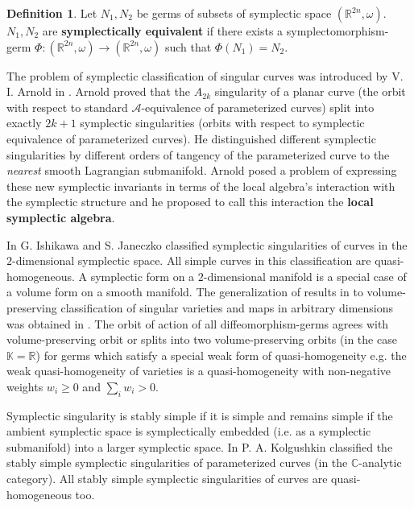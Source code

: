 \documentclass{amsart}
\theoremstyle{definition}
\newtheorem{defn}[thm]{Definition}
\numberwithin{equation}{section}
\begin{document}
\begin{defn} \label{symplecto}
Let $N_1, N_2$ be germs of subsets of symplectic space $(\mathbb{R}^{2n}, \omega)$. $N_1, N_2$
are \textbf{symplectically equivalent} if there exists a symplectomorphism-germ $\Phi:(\mathbb{R}^{2n}, \omega) \rightarrow(\mathbb{R}^{2n}, \omega)$
such that $\Phi(N_1)=N_2$.
\end{defn}

\medskip

The problem of symplectic classification of singular curves was
introduced by V. I. Arnold in \cite{Ar1}. Arnold proved that the
$A_{2k}$ singularity of a planar curve (the orbit with respect to
standard $\mathcal A$-equivalence of parameterized curves) split
into exactly $2k+1$ symplectic singularities (orbits with respect
to symplectic equivalence of parameterized curves). He
distinguished different symplectic singularities by different
orders of tangency of the parameterized curve to the
\emph{nearest} smooth Lagrangian submanifold. Arnold posed a
problem of expressing these new symplectic invariants in terms of
the local algebra's interaction with the symplectic structure and
he proposed to call this interaction the {\bf local symplectic
algebra}.

In \cite{IJ1} G. Ishikawa and S. Janeczko classified symplectic singularities of curves in the
$2$-dimensional symplectic space. All simple curves in this classification are quasi-homogeneous. A symplectic form on a $2$-dimensional manifold
is a special case of a volume form on a smooth manifold. The generalization of results
in \cite{IJ1} to volume-preserving classification of singular varieties and maps  in arbitrary dimensions was obtained in \cite{DR}.
The orbit of action of all diffeomorphism-germs agrees with volume-preserving orbit or splits into two volume-preserving orbits
(in the case $\mathbb K=\mathbb R$) for germs which satisfy a special weak form of quasi-homogeneity e.g. the weak quasi-homogeneity of varieties is a
quasi-homogeneity with non-negative weights $w_i\ge0$ and $\sum_i w_i>0$.

Symplectic singularity is stably simple if it is simple and remains simple if the ambient symplectic space is symplectically embedded
(i.e. as a symplectic submanifold) into a larger symplectic space.
In \cite{K} P. A. Kolgushkin classified the stably simple symplectic singularities of parameterized curves
(in the $\mathbb C$-analytic category). All stably simple symplectic singularities of curves are quasi-homogeneous too.
\end{document}
